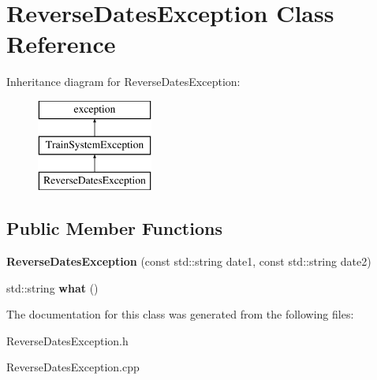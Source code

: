 \hypertarget{classReverseDatesException}{}\section{Reverse\+Dates\+Exception Class Reference}
\label{classReverseDatesException}
Inheritance diagram for Reverse\+Dates\+Exception\+:\begin{figure}[H]
\begin{center}
\leavevmode
\includegraphics[height=3.000000cm]{classReverseDatesException}
\end{center}
\end{figure}
\subsection*{Public Member Functions}
\begin{DoxyCompactItemize}
\item 
\mbox{\label{classReverseDatesException_afc245532384383f8f62b20358326c773}} 
{\bfseries Reverse\+Dates\+Exception} (const std\+::string date1, const std\+::string date2)
\item 
\mbox{\label{classReverseDatesException_a1beb55d765fec9ceca0d8e1d73486ae5}} 
std\+::string {\bfseries what} ()
\end{DoxyCompactItemize}


The documentation for this class was generated from the following files\+:\begin{DoxyCompactItemize}
\item 
Reverse\+Dates\+Exception.\+h\item 
Reverse\+Dates\+Exception.\+cpp\end{DoxyCompactItemize}
